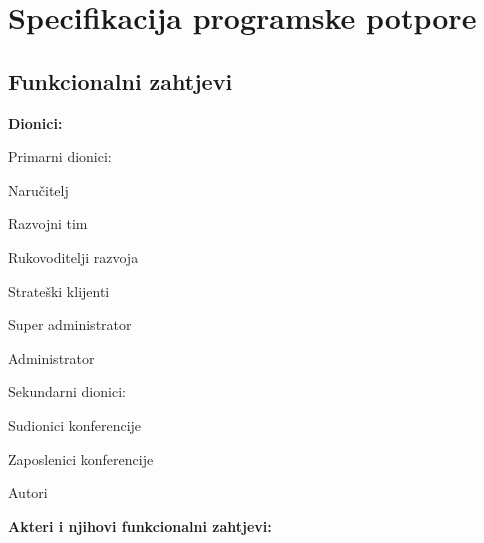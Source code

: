 \chapter{Specifikacija programske potpore}
		
	\section{Funkcionalni zahtjevi}


			
			\noindent \textbf{Dionici:}
			
			\begin{packed_enum}
				
				\item Primarni dionici:
				
				\begin{packed_enum}
					\item Naručitelj
					\item Razvojni tim
					\item Rukovoditelji razvoja
					\item Strateški klijenti
					\item Super administrator
					\item Administrator
				\end{packed_enum}
				
				\item Sekundarni dionici:	
				
				\begin{packed_enum}
					\item Sudionici konferencije
					\item Zaposlenici konferencije
					\item Autori	
				\end{packed_enum}		
				
			\end{packed_enum}
			
			\noindent \textbf{Akteri i njihovi funkcionalni zahtjevi:}
			
